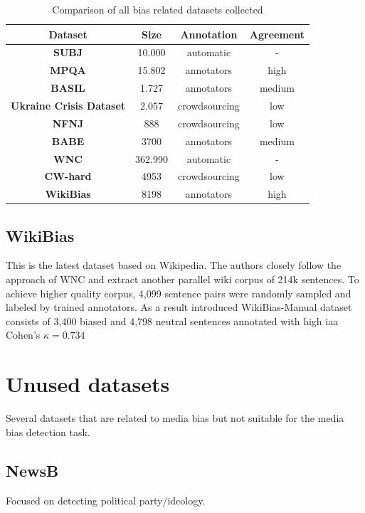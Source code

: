 \begin{table}
\begin{ctucolortab}
\begin{tabular}{c|c|c|c}
 \textbf{Dataset} & \textbf{Size} & \textbf{Annotation} & \textbf{Agreement}\\
 \hline
 \textbf{SUBJ} & 10.000 & automatic & -\\ 
 \hline
 \textbf{MPQA} & 15.802 & annotators & high \\
 \hline
 \textbf{BASIL} &  1.727 & annotators & medium \\ 
 \hline
 \textbf{Ukraine Crisis Dataset} & 2.057 & crowdsourcing & low \\ 
 \hline
 \textbf{NFNJ} & 888 & crowdsourcing & low \\
 \hline
 \textbf{BABE} & 3700 & annotators & medium \\
 \hline 
 \textbf{WNC} & 362.990 & automatic & - \\
 \hline
 \textbf{CW-hard} & 4953 & crowdsourcing & low \\
 \hline 
 \textbf{WikiBias} & 8198 & annotators & high \\
 \hline
\end{tabular}
\end{ctucolortab}
\caption{Comparison of all bias related datasets collected}
\label{table:1}
\end{table}


\subsection{WikiBias}
This is the latest dataset based on Wikipedia. The authors closely follow the approach of WNC \cite{pryzant2020automatically} and extract another parallel wiki corpus of 214k sentences.
To achieve higher quality corpus, 4,099 sentence pairs were randomly sampled and labeled by trained annotators. As a result introduced WikiBias-Manual dataset consists of 3,400 biased and 4,798 neutral sentences annotated with high \gls{iaa} Cohen's $\kappa = 0.734$




\section{Unused datasets}
Several datasets that are related to media bias but not suitable for the media bias detection task.



\subsection{NewsB}
Focused on detecting political party/ideology.




